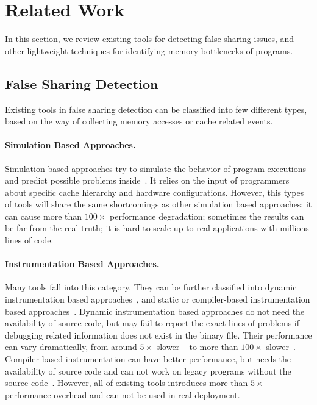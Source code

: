 \section{Related Work}

\label{sec:relatedwork}

In this section, we review existing tools for detecting false sharing issues, and other lightweight techniques for identifying memory bottlenecks of programs.

\subsection{False Sharing Detection}

Existing tools in false sharing detection can be classified into few different types, based on the way of collecting memory accesses or cache related events. 

\paragraph{Simulation Based Approaches.} Simulation based approaches try to simulate the behavior of program executions and predict possible problems inside~\cite{falseshare:simulator}. It relies on the input of programmers about specific cache hierarchy and hardware configurations. However, this types of tools will share the same shortcomings as other simulation based approaches: it can cause more than $100\times$ performance degradation; sometimes the results can be far from the real truth; it is hard to scale up to real applications with millions lines of code. 


\paragraph{Instrumentation Based Approaches.} Many tools fall into this category. They can be further classified into dynamic instrumentation based approaches~\cite{falseshare:binaryinstrumentation1, falseshare:binaryinstrumentation2, qinzhao}, and static or compiler-based instrumentation based approaches~\cite{Predator}. Dynamic instrumentation based approaches do not need the availability of source code, but may fail to report the exact lines of problems if debugging related information does not exist in the binary file. Their performance can vary dramatically, from around $5\times$ slower ~\cite{qinzhao} to more than $100\times$ slower~\cite{falseshare:binaryinstrumentation1, falseshare:binaryinstrumentation2}. Compiler-based instrumentation can have better performance,  but needs the availability of source code and can not work on legacy programs without the source code~\cite{Predator}. However, all of existing tools introduces more than $5\times$ performance overhead and can not be used in real deployment. 


